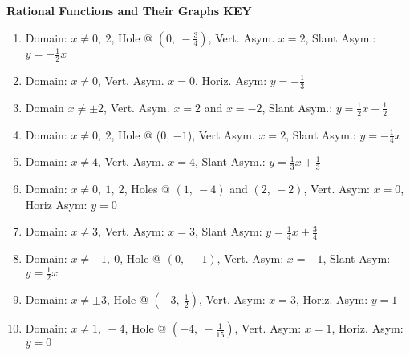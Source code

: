 \documentclass[11pt]{article}
\begin{document}
\textbf{Rational Functions and Their Graphs KEY}
\begin{enumerate}
    \item Domain: $x\neq 0, \ 2$, Hole @ $\left(0, \ -\frac{3}{4}\right)$, Vert. Asym. $x = 2$, Slant Asym.: $y=-\frac{1}{2}x$ \\[0.25in]
    
    \item Domain: $x\neq 0$, Vert. Asym. $x = 0$, Horiz. Asym: $y=-\frac{1}{3}$\\[0.25in]
    
    \item Domain $x \neq \pm 2$, Vert. Asym. $x=2$ and $x=-2$, Slant Asym.: $y=\frac{1}{2}x + \frac{1}{2}$\\[0.25in]
    
    \item Domain: $x \neq 0, \ 2$, Hole @ (0, $-1$), Vert Asym. $x=2$, Slant Asym.: $y=-\frac{1}{4}x$\\[0.25in]
    
    \item Domain: $x \neq 4$, Vert. Asym. $x=4$, Slant Asym.: $y=\frac{1}{3}x+\frac{1}{3}$\\[0.25in]
    
    \item Domain: $x \neq 0, \ 1, \ 2$, Holes @ $(1, \ -4)$ and $(2, \ -2)$, Vert. Asym: $x=0$, Horiz Asym: $y=0$\\[0.25in]
    
    \item Domain: $x \neq 3$, Vert. Asym: $x=3$, Slant Asym: $y=\frac{1}{4}x+\frac{3}{4}$\\[0.25in]
    
    \item Domain: $x \neq -1, \ 0$, Hole @ $(0, \ -1)$, Vert. Asym: $x=-1$, Slant Asym: $y=\frac{1}{2}x$\\[0.25in]
    
    \item Domain: $x \neq \pm 3$, Hole @ $\left(-3, \ \frac{1}{2}\right)$, Vert. Asym: $x = 3$, Horiz. Asym: $y=1$\\[0.25in]
    
    \item Domain: $x \neq 1, \ -4$, Hole @ $\left(-4, \ -\frac{1}{15}\right)$, Vert. Asym: $x=1$, Horiz. Asym: $y=0$
\end{enumerate}
\end{document}

